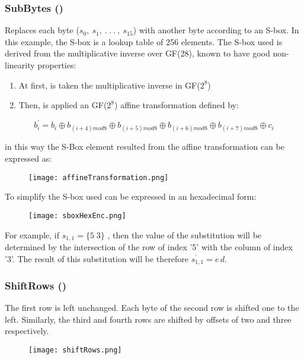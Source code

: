 \documentclass{article}
\begin{document}
\subsubsection{SubBytes ()}
Replaces each byte ($s_0,\: s_1,\: .\: .\: .\: ,\: s_15$) with another byte according to an S-box. In this example, the S-box is a lookup table of 256 elements.
The S-box used is derived from the multiplicative inverse over GF(28), known to have good non-linearity properties:
\begin{enumerate}
    \item At first, is taken the multiplicative inverse in GF($2^8$)
    \item Then, is applied an GF($2^8$) affine transformation defined by:
\end{enumerate}
 \[b^{'}_i  =  b_i\oplus b_{(i+4)mod 8}\oplus  b_{(i+5) mod 8 }\oplus b_{(i+6) mod 8} \oplus b_{(i+7) mod 8} \oplus  c_i\]

in this way the S-Box element resulted from the affine transformation can be expressed as:
\begin{figure}[htb]
	\begin{center}
  		\texttt{[image: affineTransformation.png]} 
 	\end{center}
\end{figure}
To simplify the S-box used can be expressed in an hexadecimal form:
 \begin{figure}[htb]
	\begin{center}
  		\texttt{[image: sboxHexEnc.png]} 
 	\end{center}
\end{figure}
\label{sec:sboxEnc}
For example, if $s_{1,1}= \{ 5\; 3 \}$ , then the value of the substitution will be determined by the intersection of the row of index '5' with the column of index '3'. The result of this substitution will be therefore $s_{1,1}^{’}={e\,d}$.

\subsubsection{ ShiftRows ()}
The first row is left unchanged. Each byte of the second row is shifted one to the left. Similarly, the third and fourth rows are shifted by offsets of two and three respectively.
\begin{figure}[htb]
	\begin{center}
  		\texttt{[image: shiftRows.png]} 
 	\end{center}
\end{figure}
\end{document}

